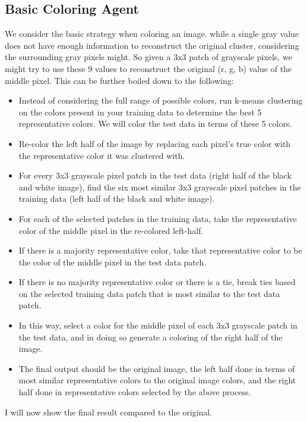 \documentclass[12pt]{article} %
\begin{document}
\subsection{Basic Coloring Agent}
We consider the basic strategy when coloring an image. while a single gray value does not have enough information
to reconstruct the original cluster, considering the surrounding gray pixels might. So given a 3x3 patch of grayscale
pixels, we might try to use these 9 values to reconstruct the original (r, g, b) value of the middle pixel. This can be further boiled down to the following:
\begin{itemize}
\item Instead of considering the full range of possible colors, run k-means clustering on the colors present in your
training data to determine the best 5 representative colors. We will color the test data in terms of these 5
colors.
\item Re-color the left half of the image by replacing each pixel’s true color with the representative color it was
clustered with.
\item For every 3x3 grayscale pixel patch in the test data (right half of the black and white image), find the six most
similar 3x3 grayscale pixel patches in the training data (left half of the black and white image).
\item For each of the selected patches in the training data, take the representative color of the middle pixel in the
re-colored left-half.
\item If there is a majority representative color, take that representative color to be the color of the middle pixel in
the test data patch.
\item If there is no majority representative color or there is a tie, break ties based on the selected training data patch
that is most similar to the test data patch.
\item In this way, select a color for the middle pixel of each 3x3 grayscale patch in the test data, and in doing so
generate a coloring of the right half of the image.
\item The final output should be the original image, the left half done in terms of most similar representative colors
to the original image colors, and the right half done in representative colors selected by the above process.
\end{itemize}
I will now show the final result compared to the original. 
\end{document}
